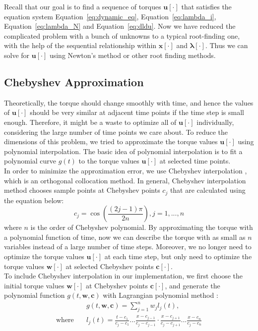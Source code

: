 \null \quad Recall that our goal is to find a sequence of torques $\mathbf u[\cdot]$ that satisfies the equation system Equation~\ref{eq:dynamic_eq}, Equation~\ref{eq:lambda_i}, Equation~\ref{eq:lambda_N} and Equation~\ref{eq:dldu}. Now we have reduced the complicated problem with a bunch of unknowns to a typical root-finding one, with the help of the sequential relationship within $\mathbf x[\cdot]$ and $\mathbf \lambda[\cdot]$. Thus we can solve for $\mathbf u[\cdot]$ using Newton's method or other root finding methods.

 \subsection{Chebyshev Approximation}
\quad Theoretically, the torque should change smoothly with time, and hence the values of $\mathbf u[\cdot]$ should be very similar at adjacent time points if the time step is small enough. Therefore, it might be a waste to optimize all of $\mathbf u[\cdot]$ individually, considering the large number of time points we care about. To reduce the dimensions of this problem, we tried to approximate the torque values $\mathbf u[\cdot]$ using polynomial interpolation. The basic idea of polynomial interpolation is to fit a polynomial curve $g(t)$ to the torque values $\mathbf u[\cdot]$ at selected time points.\\
\null \quad In order to minimize the approximation error, we use Chebyshev interpolation \cite{chebyshev}, which is an orthogonal collocation method. In general, Chebyshev interpolation method chooses sample points at Chebyshev points $c_j$ that are calculated using the equation below:
\begin{equation} \label{cheby}
c_j = \cos \left( \frac{(2j - 1)\pi}{2n} \right), j = 1, . . . , n
 \end{equation}
where $n$ is the order of Chebyshev polynomial. By approximating the torque with a polynomial function of time,  now we can describe the torque with as small as $n$ variables instead of a large number of time steps. Moreover, we no longer need to optimize the torque values $\mathbf u[\cdot]$ at each time step, but only need to optimize the torque values $\mathbf w[\cdot]$ at selected Chebyshev points $\mathbf c[\cdot]$. \\
\null \quad To include Chebyshev interpolation in our implementation, we first choose the initial torque values $\mathbf w[\cdot]$ at Chebyshev points $\mathbf c[\cdot]$, and generate the polynomial function $g(t, \mathbf w, \mathbf c)$ with Lagrangian polynomial method \cite{lagrange_interpolation}:
\begin{align} \label{eq:l_i}
 & g(t, \mathbf w, \mathbf c) =\sum_{j=1}^n w_jl_j(t), \nonumber \\
\text{where} \quad
& l_j(t) =\frac{t-c_1}{c_j-c_1}  ... \frac{x-c_{j-1}}{c_j-c_{j-1}} \cdot \frac{x-c_{j+1}}{c_j-c_{j+1}} ...  \frac{x-c_n}{c_j-c_n} \nonumber \\
\end{align}


